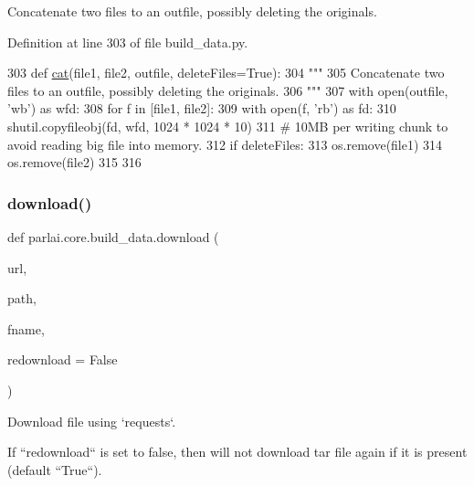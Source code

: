 \begin{DoxyVerb}Concatenate two files to an outfile, possibly deleting the originals.
\end{DoxyVerb}
 

Definition at line 303 of file build\+\_\+data.\+py.


\begin{DoxyCode}
303 \textcolor{keyword}{def }\hyperlink{namespaceparlai_1_1core_1_1build__data_adc4feba864e2a0d0663cdf6bf84afaf6}{cat}(file1, file2, outfile, deleteFiles=True):
304     \textcolor{stringliteral}{"""}
305 \textcolor{stringliteral}{    Concatenate two files to an outfile, possibly deleting the originals.}
306 \textcolor{stringliteral}{    """}
307     with open(outfile, \textcolor{stringliteral}{'wb'}) \textcolor{keyword}{as} wfd:
308         \textcolor{keywordflow}{for} f \textcolor{keywordflow}{in} [file1, file2]:
309             with open(f, \textcolor{stringliteral}{'rb'}) \textcolor{keyword}{as} fd:
310                 shutil.copyfileobj(fd, wfd, 1024 * 1024 * 10)
311                 \textcolor{comment}{# 10MB per writing chunk to avoid reading big file into memory.}
312     \textcolor{keywordflow}{if} deleteFiles:
313         os.remove(file1)
314         os.remove(file2)
315 
316 
\end{DoxyCode}
\mbox{\label{namespaceparlai_1_1core_1_1build__data_ab74f0e428f05e5d91fa93c8afb367622}} 
\subsubsection{\texorpdfstring{download()}{download()}}
{\footnotesize\ttfamily def parlai.\+core.\+build\+\_\+data.\+download (\begin{DoxyParamCaption}\item[{}]{url,  }\item[{}]{path,  }\item[{}]{fname,  }\item[{}]{redownload = {\ttfamily False} }\end{DoxyParamCaption})}

\begin{DoxyVerb}Download file using `requests`.

If ``redownload`` is set to false, then will not download tar file again if it is
present (default ``True``).
\end{DoxyVerb}
 

